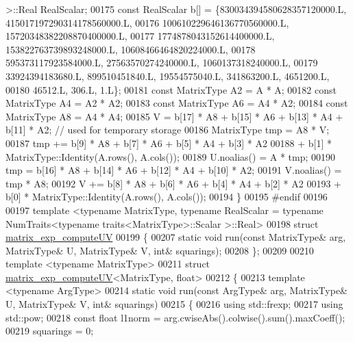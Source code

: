 \begin{DoxyCode}
      >::Real RealScalar;
00175   \textcolor{keyword}{const} RealScalar b[] = \{830034394580628357120000.L, 415017197290314178560000.L,
00176                           100610229646136770560000.L, 15720348382208870400000.L,
00177                           1774878043152614400000.L, 153822763739893248000.L, 10608466464820224000.L,
00178                           595373117923584000.L, 27563570274240000.L, 1060137318240000.L,
00179                           33924394183680.L, 899510451840.L, 19554575040.L, 341863200.L, 4651200.L,
00180                           46512.L, 306.L, 1.L\};
00181   \textcolor{keyword}{const} MatrixType A2 = A * A;
00182   \textcolor{keyword}{const} MatrixType A4 = A2 * A2;
00183   \textcolor{keyword}{const} MatrixType A6 = A4 * A2;
00184   \textcolor{keyword}{const} MatrixType A8 = A4 * A4;
00185   V = b[17] * A8 + b[15] * A6 + b[13] * A4 + b[11] * A2; \textcolor{comment}{// used for temporary storage}
00186   MatrixType tmp = A8 * V;
00187   tmp += b[9] * A8 + b[7] * A6 + b[5] * A4 + b[3] * A2 
00188     + b[1] * MatrixType::Identity(A.rows(), A.cols());
00189   U.noalias() = A * tmp;
00190   tmp = b[16] * A8 + b[14] * A6 + b[12] * A4 + b[10] * A2;
00191   V.noalias() = tmp * A8;
00192   V += b[8] * A8 + b[6] * A6 + b[4] * A4 + b[2] * A2 
00193     + b[0] * MatrixType::Identity(A.rows(), A.cols());
00194 \}
00195 \textcolor{preprocessor}{#endif}
00196 
00197 template <typename MatrixType, typename RealScalar = typename NumTraits<typename traits<MatrixType>::Scalar
      >::Real>
00198 \textcolor{keyword}{struct }\hyperlink{struct_eigen_1_1internal_1_1matrix__exp__compute_u_v}{matrix\_exp\_computeUV}
00199 \{
00207   \textcolor{keyword}{static} \textcolor{keywordtype}{void} run(\textcolor{keyword}{const} MatrixType& arg, MatrixType& U, MatrixType& V, \textcolor{keywordtype}{int}& squarings);
00208 \};
00209 
00210 \textcolor{keyword}{template} <\textcolor{keyword}{typename} MatrixType>
00211 \textcolor{keyword}{struct }\hyperlink{struct_eigen_1_1internal_1_1matrix__exp__compute_u_v}{matrix\_exp\_computeUV}<MatrixType, float>
00212 \{
00213   \textcolor{keyword}{template} <\textcolor{keyword}{typename} ArgType>
00214   \textcolor{keyword}{static} \textcolor{keywordtype}{void} run(\textcolor{keyword}{const} ArgType& arg, MatrixType& U, MatrixType& V, \textcolor{keywordtype}{int}& squarings)
00215   \{
00216     \textcolor{keyword}{using} std::frexp;
00217     \textcolor{keyword}{using} std::pow;
00218     \textcolor{keyword}{const} \textcolor{keywordtype}{float} l1norm = arg.cwiseAbs().colwise().sum().maxCoeff();
00219     squarings = 0;

\end{DoxyCode}
